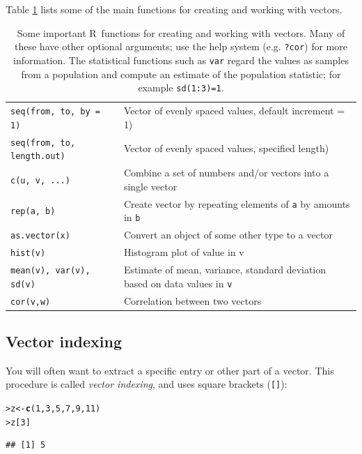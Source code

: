 \documentclass[11pt]{article}\usepackage[]{graphicx}\usepackage[]{color}
\makeatletter
\newcommand{\hlnum}[1]{\textcolor[rgb]{0.686,0.059,0.569}{#1}}%
\newcommand{\hlstd}[1]{\textcolor[rgb]{0.345,0.345,0.345}{#1}}%
\newcommand{\hlkwb}[1]{\textcolor[rgb]{0.69,0.353,0.396}{#1}}%
\newcommand{\hlkwd}[1]{\textcolor[rgb]{0.737,0.353,0.396}{\textbf{#1}}}%
\newenvironment{kframe}{%
 \def\at@end@of@kframe{}%
 \ifinner\ifhmode%
  \def\at@end@of@kframe{\end{minipage}}%
  \begin{minipage}{\columnwidth}%
 \fi\fi%
 \def\FrameCommand##1{\hskip\@totalleftmargin \hskip-\fboxsep
 \colorbox{shadecolor}{##1}\hskip-\fboxsep
     \hskip-\linewidth \hskip-\@totalleftmargin \hskip\columnwidth}%
 \MakeFramed {\advance\hsize-\width
   \@totalleftmargin\z@ \linewidth\hsize
   \@setminipage}}%
 {\par\unskip\endMakeFramed%
 \at@end@of@kframe}
\newenvironment{knitrout}{}{} %
\newcommand{\code}[1]{{\tt #1}}
\newcommand\R{{\sf R}}
\numberwithin{exercise}{section}
\makeatother
\begin{document}
Table \ref{VectorFunctions} lists some of the main functions 
for creating and working with vectors.

\begin{table}[t]
\begin{tabular}
{p{140pt}p{290pt}}
\hline
\code{seq(from, to, by = 1)} & Vector of evenly spaced values, default increment = 1) \\
\code{seq(from, to, length.out)} & Vector of evenly spaced values, specified length) \\
\code{c(u, v, ...) } & Combine a set of numbers and/or vectors into a single vector \\
\code{rep(a, b)} & Create vector by repeating elements of \code{a} by amounts in \code{b} \\
\code{as.vector(x)} & Convert an object of some other type to a vector \\ 
\code{hist(v)} & Histogram plot of value in v \\
\code{mean(v), var(v), sd(v)} & Estimate of mean, variance, standard deviation based on data values in \code{v} \\
\code{cor(v,w)} & Correlation between two vectors \\
\hline
\end{tabular}
\caption{Some important \R\ functions for creating and working with vectors. Many of these have other optional
arguments; use the help system (e.g. \code{?cor}) for more information. The statistical functions such as
\code{var} regard the values as samples from a population and compute an estimate of the population 
statistic; for example \code{sd(1:3)=1}.}
\label{VectorFunctions}
\end{table}

\subsection{Vector indexing}
You will often want to extract a specific 
entry or other part of a vector. This procedure
is called \emph{vector indexing}, and uses
square brackets (\code{[]}):
\begin{knitrout}
\color{fgcolor}\begin{kframe}
\begin{alltt}
\hlstd{> }\hlstd{z} \hlkwb{<-} \hlkwd{c}\hlstd{(}\hlnum{1}\hlstd{,} \hlnum{3}\hlstd{,} \hlnum{5}\hlstd{,} \hlnum{7}\hlstd{,} \hlnum{9}\hlstd{,} \hlnum{11}\hlstd{)}
\hlstd{> }\hlstd{z[}\hlnum{3}\hlstd{]}
\end{alltt}
\begin{verbatim}
## [1] 5
\end{verbatim}
\end{kframe}
\end{knitrout}
\end{document}
